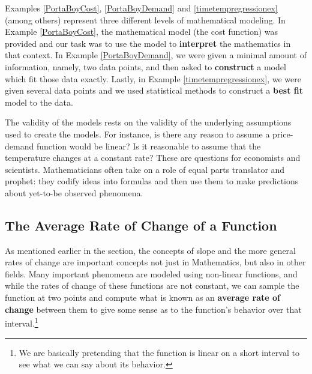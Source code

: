 \documentclass{ximera}
\begin{document}
\begin{example}
\begin{explanation}
\begin{enumerate}
\end{enumerate}
\end{explanation}
\end{example}
 
Examples \ref{PortaBoyCost}, \ref{PortaBoyDemand} and \ref{timetempregressionex} (among others)  represent three different levels of mathematical modeling.  In Example  \ref{PortaBoyCost},  the mathematical model (the cost function) was provided and our task was to use the model to \textbf{interpret} the mathematics in that context.    In Example  \ref{PortaBoyDemand}, we were given a minimal amount of information, namely, two data points, and then asked to \textbf{construct} a model which fit those data exactly.  Lastly, in Example \ref{timetempregressionex}, we were given several data points and we used statistical methods to construct a \textbf{best fit} model to the data. 



The validity of the models rests on the validity of the underlying assumptions used to create the models.  For instance, is there any reason to assume a price-demand function would be linear?  Is it reasonable to assume that the temperature changes at a constant rate? These are questions for economists and scientists.  Mathematicians often take on a role of equal parts translator and prophet:  they codify ideas into formulas and then use them to make predictions about yet-to-be observed phenomena.  


\subsection{The Average Rate of Change of a Function}
\label{AverageRateofChange}

As mentioned earlier in the section, the concepts of slope and the more general rates of change are important concepts not just in Mathematics, but also in other fields.   Many important phenomena are modeled using non-linear functions, and while the rates of change of these functions are not constant, we can sample the function at two points and compute what is known as an \textbf{average rate of change} between them to give some sense as to the function's behavior over that interval.\footnote{We are basically pretending that the function is linear on a short interval to see what we can say about its behavior.}
\end{document}
